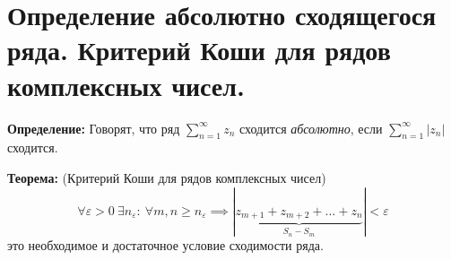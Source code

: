 \section{Определение абсолютно сходящегося ряда. Критерий Коши для рядов
комплексных
чисел.}\label{ux43eux43fux440ux435ux434ux435ux43bux435ux43dux438ux435-ux430ux431ux441ux43eux43bux44eux442ux43dux43e-ux441ux445ux43eux434ux44fux449ux435ux433ux43eux441ux44f-ux440ux44fux434ux430.-ux43aux440ux438ux442ux435ux440ux438ux439-ux43aux43eux448ux438-ux434ux43bux44f-ux440ux44fux434ux43eux432-ux43aux43eux43cux43fux43bux435ux43aux441ux43dux44bux445-ux447ux438ux441ux435ux43b.}

\textbf{Определение:} Говорят, что ряд
\(\sum\limits_{n=1}^{\infty}z_{n}\) сходится \emph{абсолютно}, если
\(\sum\limits_{n=1}^{\infty}|z_{n}|\) сходится.

\textbf{Теорема:} (Критерий Коши для рядов комплексных чисел) \[
\forall\varepsilon>0 \ \exists n_{\varepsilon}: \ \forall m,n\geq n_{\varepsilon}\implies |\underbrace{z_{m+1}+z_{m+2}+\dots+z_{n}}_{S_{n}-S_{m}}|<\varepsilon
\] это необходимое и достаточное условие сходимости ряда.
